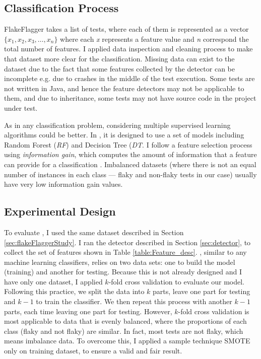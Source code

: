 \subsection{Classification Process}

FlakeFlagger takes a list of tests, where each of them is represented as a vector $\{x_1, x_2, x_3,\dots, x_n\}$  where each \emph{x} represents a feature value and \emph{n} correspond the total number of features. I applied data inspection and cleaning process to make that dataset more clear for the classification. Missing data can exist to the dataset due to the fact that some features collected by the detector can be incomplete e.g. due to crashes in the middle of the test execution. Some tests are not written in Java, and hence the feature detectors may not be applicable to them, and due to inheritance, some tests may not have source code in the project under test.

As in any classification problem, considering multiple supervised learning algorithms could be better. In \sysName, it is designed to use a set of models including Random Forest (\emph{RF}) and Decision Tree (\emph{DT}. I follow a feature selection process using \emph{information gain}, which computes the amount of information that a feature can provide for a classification \cite{lei2012feature}. Imbalanced datasets (where there is not an equal number of instances in each class --- flaky and non-flaky tests in our case) usually have very low information gain values. 


\subsection{Experimental Design}
\label{sec:Prediction_Design}
To evaluate \sysName, I used the same dataset described in Section \ref{sec:flakeFlaggerStudy}. I ran the detector described in Section \ref{sec:detector}, to collect the set of features shown in Table \ref{table:Feature_desc}. \sysName, similar to any machine learning classifiers, relies on two data sets: one to build the model (training) and another for testing. Because this is not already designed and I have only one dataset, I applied $k$-fold cross validation  \cite{kohavi1995study,bengio2004no} to evaluate our model. Following this practice, we split the data into $k$ parts, leave one part for testing and $k-1$ to train the classifier.
We then repeat this process with another $k-1$ parts, each time leaving one part for testing.
However, $k$-fold cross validation is most applicable to data that is evenly balanced, where the proportions of each class (flaky and not flaky) are similar. In fact, most tests are not flaky, which means imbalance data. To overcome this, I applied a sample technique SMOTE \cite{chawla2002smote} only on training dataset, to ensure a valid and fair result.


